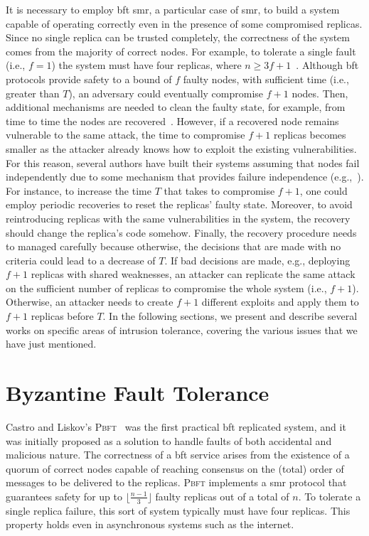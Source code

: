 It is necessary to employ \gls{bft} \gls{smr}, a particular case of \gls{smr}, to build a system capable of operating correctly even in the presence of some compromised replicas.
Since no single replica can be trusted completely, the correctness of the system comes from the majority of correct nodes.
For example, to tolerate a single fault (i.e., $f=1$) the system must have four replicas, where $n \geq 3f+1$~\cite{Castro:2002}.
Although \gls{bft} protocols provide safety to a bound of $f$ faulty nodes, with sufficient time (i.e., greater than $T$), an adversary could eventually compromise $f+1$ nodes.
Then, additional mechanisms are needed to clean the faulty state, for example, from time to time the nodes are recovered~\cite{Castro:2002}.
However, if a recovered node remains vulnerable to the same attack, the time to compromise $f+1$ replicas becomes smaller as the attacker already knows how to exploit the existing vulnerabilities.
For this reason, several authors have built their systems assuming that nodes fail independently due to some mechanism that provides failure independence (e.g.,~\cite{Castro:2002,Bessani:2008,Veronese:2013,Sousa:2010}).
For instance, to increase the time $T$ that takes to compromise $f+1$, one could employ periodic recoveries to reset the replicas' faulty state. 
Moreover, to avoid reintroducing replicas with the same vulnerabilities in the system, the recovery should change the replica's code somehow.
Finally, the recovery procedure needs to managed carefully because otherwise, the decisions that are made with no criteria could lead to a decrease of $T$.
If bad decisions are made, e.g., deploying $f+1$ replicas with shared weaknesses, an attacker can replicate the same attack on the sufficient number of replicas to compromise the whole system (i.e., $f+1$).
Otherwise, an attacker needs to create $f+1$ different exploits and apply them to $f+1$ replicas before $T$. 
In the following sections, we present and describe several works on specific areas of intrusion tolerance, covering the various issues that we have just mentioned.


\section{Byzantine Fault Tolerance}

Castro and Liskov’s \textsc{Pbft}~\cite{Castro:1999} was the first practical \gls{bft} replicated system, and it was initially proposed as a solution to handle faults of both accidental and malicious nature.
The correctness of a \gls{bft} service arises from the existence of a quorum of correct nodes capable of reaching consensus on the (total) order of messages to be delivered to the replicas.
\textsc{Pbft} implements a \gls{smr} protocol that guarantees safety for up to $\lfloor\frac{n-1}{3}\rfloor$ faulty replicas out of a total of $n$. 
To tolerate a single replica failure, this sort of system typically must have four replicas. 
This property holds even in asynchronous systems such as the internet. 

